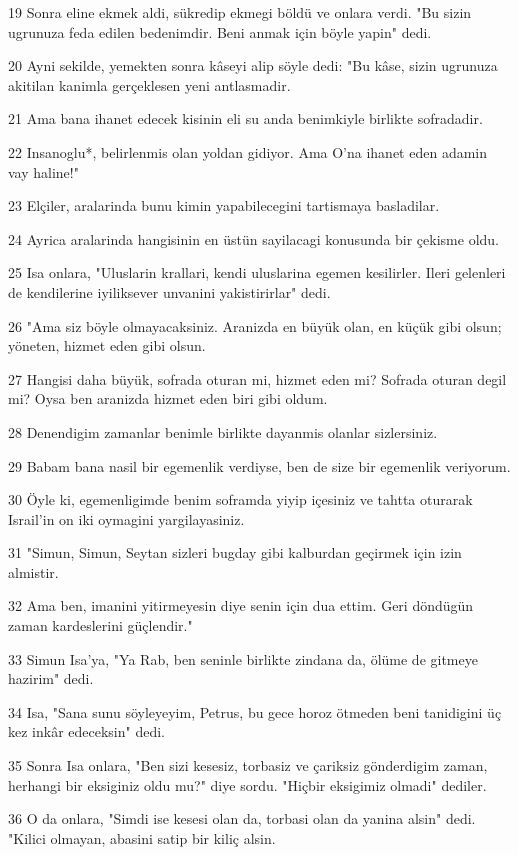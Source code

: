 \par 19 Sonra eline ekmek aldi, sükredip ekmegi böldü ve onlara verdi. "Bu sizin ugrunuza feda edilen bedenimdir. Beni anmak için böyle yapin" dedi.
\par 20 Ayni sekilde, yemekten sonra kâseyi alip söyle dedi: "Bu kâse, sizin ugrunuza akitilan kanimla gerçeklesen yeni antlasmadir.
\par 21 Ama bana ihanet edecek kisinin eli su anda benimkiyle birlikte sofradadir.
\par 22 Insanoglu*, belirlenmis olan yoldan gidiyor. Ama O'na ihanet eden adamin vay haline!"
\par 23 Elçiler, aralarinda bunu kimin yapabilecegini tartismaya basladilar.
\par 24 Ayrica aralarinda hangisinin en üstün sayilacagi konusunda bir çekisme oldu.
\par 25 Isa onlara, "Uluslarin krallari, kendi uluslarina egemen kesilirler. Ileri gelenleri de kendilerine iyiliksever unvanini yakistirirlar" dedi.
\par 26 "Ama siz böyle olmayacaksiniz. Aranizda en büyük olan, en küçük gibi olsun; yöneten, hizmet eden gibi olsun.
\par 27 Hangisi daha büyük, sofrada oturan mi, hizmet eden mi? Sofrada oturan degil mi? Oysa ben aranizda hizmet eden biri gibi oldum.
\par 28 Denendigim zamanlar benimle birlikte dayanmis olanlar sizlersiniz.
\par 29 Babam bana nasil bir egemenlik verdiyse, ben de size bir egemenlik veriyorum.
\par 30 Öyle ki, egemenligimde benim soframda yiyip içesiniz ve tahtta oturarak Israil'in on iki oymagini yargilayasiniz.
\par 31 "Simun, Simun, Seytan sizleri bugday gibi kalburdan geçirmek için izin almistir.
\par 32 Ama ben, imanini yitirmeyesin diye senin için dua ettim. Geri döndügün zaman kardeslerini güçlendir."
\par 33 Simun Isa'ya, "Ya Rab, ben seninle birlikte zindana da, ölüme de gitmeye hazirim" dedi.
\par 34 Isa, "Sana sunu söyleyeyim, Petrus, bu gece horoz ötmeden beni tanidigini üç kez inkâr edeceksin" dedi.
\par 35 Sonra Isa onlara, "Ben sizi kesesiz, torbasiz ve çariksiz gönderdigim zaman, herhangi bir eksiginiz oldu mu?" diye sordu. "Hiçbir eksigimiz olmadi" dediler.
\par 36 O da onlara, "Simdi ise kesesi olan da, torbasi olan da yanina alsin" dedi. "Kilici olmayan, abasini satip bir kiliç alsin.

